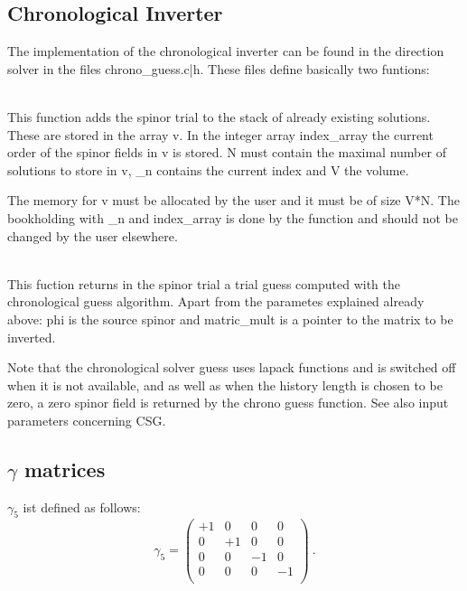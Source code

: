 \subsection{Chronological Inverter}

The implementation of the chronological inverter \cite{Brower:1995vx}
can be found in the direction {\ttfamily solver} in the files
{\ttfamily chrono\_guess.c|h}. These files define basically two
funtions:

\\
This function adds the spinor {\ttfamily trial} to the stack of
already existing solutions. These are stored in the array {\ttfamily
  v}. In the integer array {\ttfamily index\_array} the current order
of the spinor fields in {\ttfamily v} is stored. {\ttfamily N} must
contain the maximal number of solutions to store in {\ttfamily v},
{\ttfamily \_n} contains the current index and {\ttfamily V} the volume.

The memory for {\ttfamily v} must be allocated by the user and it must
be of size {\ttfamily V*N}. The bookholding with {\ttfamily \_n} and
{\ttfamily index\_array} is done by the function and should not be
changed by the user elsewhere.

\\
This fuction returns in the spinor {\ttfamily trial} a trial guess
computed with the chronological guess algorithm. Apart from the
parametes explained already above: {\ttfamily phi} is the source
spinor and {\ttfamily matric\_mult} is a pointer to the matrix to be
inverted.

Note that the chronological solver guess uses lapack functions and is
switched off when it is not available, and as well as when the history
length is chosen to be zero, a zero spinor field is returned by the
chrono guess function. See also input parameters concerning CSG.

\subsection{$\gamma$ matrices}
\label{gammas}
$\gamma_5$ ist defined as follows:
\[
  \gamma_5 =
  \begin{pmatrix}
    +1 & 0 & 0 & 0 \\
    0 & +1 & 0 & 0 \\
    0 & 0 & -1 & 0 \\
    0 & 0 & 0 & -1 \\    
  \end{pmatrix}\ .
\]


